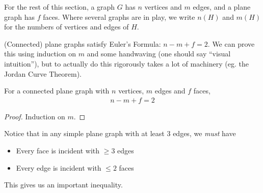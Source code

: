 \begin{boxlnotation}
    For the rest of this section, a graph $G$ has $n$ vertices and $m$ edges, and a plane graph has $f$ faces. Where several graphs are in play, we write $n(H)$ and $m(H)$ for the numbers of vertices and edges of $H$.
\end{boxlnotation}

(Connected) plane graphs satisfy Euler's Formula: $n - m + f = 2$. We can prove this using induction on $m$ and some handwaving (one should say ``visual intuition''), but to actually do this rigorously takes a lot of machinery (eg. the Jordan Curve Theorem).

\begin{boxtheorem}
    For a connected plane graph with $n$ vertices, $m$ edges and $f$ faces,
    \begin{align*}
        n - m + f = 2
    \end{align*}
\end{boxtheorem}
\begin{proof}
    Induction on $m$. \sorry %
\end{proof}

Notice that in any simple plane graph with at least $3$ edges, we \textit{must} have
\begin{itemize}
    \item Every face is incident with $\geq 3$ edges
    \item Every edge is incident with $\leq 2$ faces
\end{itemize}

This gives us an important inequality.

